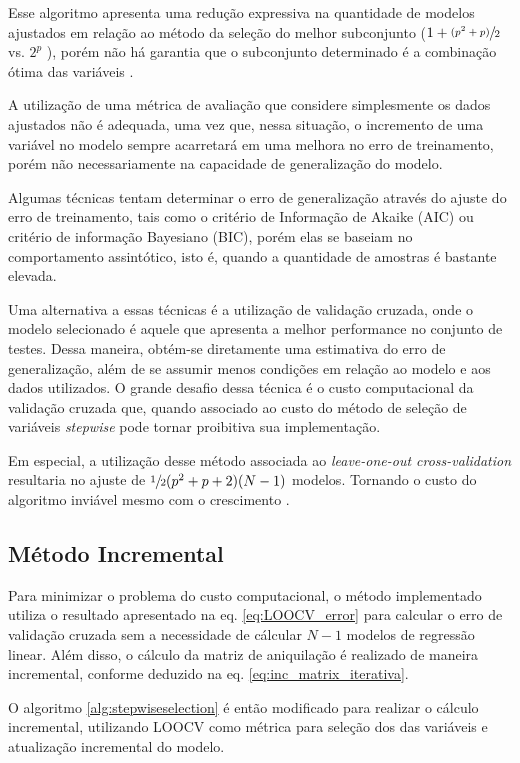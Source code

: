 Esse algoritmo apresenta uma redução expressiva na quantidade de modelos ajustados em relação ao método da 
seleção do melhor subconjunto ($1+\sfrac{(p^2+p)}{2}$ vs. $2^p$ ), porém não há
garantia que o subconjunto determinado é a combinação ótima das variáveis \cite[p. 208]{intro_stat_learn}.

A utilização de uma métrica de avaliação que considere simplesmente os dados ajustados não é adequada, 
uma vez que, nessa situação, o incremento de uma variável no modelo sempre acarretará em uma melhora no erro de 
treinamento, porém não necessariamente na capacidade de generalização do modelo.

Algumas técnicas tentam determinar o erro de generalização através do ajuste do erro de treinamento, tais como o 
critério de Informação de Akaike (AIC) ou critério de informação Bayesiano (BIC), porém elas se baseiam no 
comportamento assintótico, isto é, quando a quantidade de amostras é bastante elevada.

Uma alternativa a essas técnicas é a utilização de validação cruzada, onde o modelo selecionado é aquele que 
apresenta a melhor performance no conjunto de testes. Dessa maneira, obtém-se diretamente uma estimativa do erro 
de generalização, além de se assumir menos condições em relação ao modelo e aos dados utilizados. O grande 
desafio dessa técnica é o custo computacional da validação cruzada que, quando associado ao custo do método de 
seleção de variáveis \textit{stepwise} pode tornar proibitiva sua implementação.

Em especial, a utilização desse método associada ao \textit{leave-one-out cross-validation} resultaria no ajuste 
de $\sfrac{1}{2}(p^2+p+2)(N-1)$ modelos. Tornando o custo do algoritmo inviável mesmo com o crescimento .

\subsection{Método Incremental}

Para minimizar o problema do custo computacional, o método implementado utiliza o resultado apresentado na eq. 
\ref{eq:LOOCV_error} para calcular o erro de validação cruzada sem a necessidade de cálcular $N-1$ modelos de 
regressão linear. Além disso, o cálculo da matriz de aniquilação é realizado de maneira incremental, conforme 
deduzido na eq. \ref{eq:inc_matrix_iterativa}.

O algoritmo \ref{alg:stepwiseselection} é então modificado para realizar o cálculo incremental, utilizando 
LOOCV como métrica para seleção dos das variáveis e atualização incremental do modelo.

